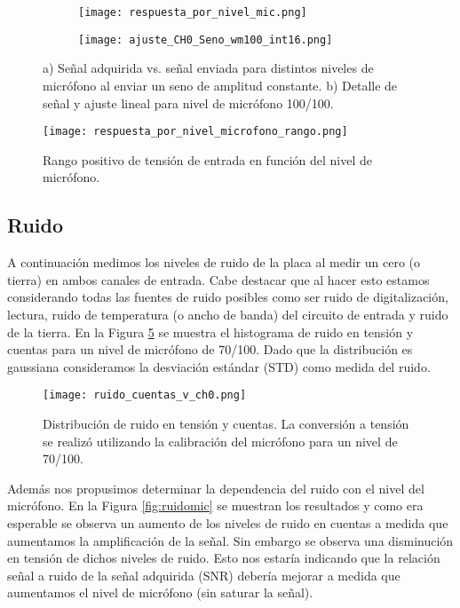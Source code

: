 \documentclass[a4paper, 11pt]{article}
\begin{document}
\begin{figure}[H]
        \begin{subfigure}[b]{0.5\textwidth}
                \centering
                \texttt{[image: respuesta\_por\_nivel\_mic.png]}
                \caption{} \label{fig:calibmic}
        \end{subfigure}%
        \begin{subfigure}[b]{0.5\textwidth}
                \centering
                \texttt{[image: ajuste\_CH0\_Seno\_wm100\_int16.png]}
                \caption{} \label{fig:ejemplo_rangomic}
        \end{subfigure}%
        \caption{a) Señal adquirida vs. señal enviada para distintos niveles de micrófono al enviar un seno de amplitud constante. b) Detalle de señal y ajuste lineal para nivel de micrófono 100/100.}\label{fig:calib_microfono}
\end{figure}

\begin{figure} [H]
\centering
\texttt{[image: respuesta\_por\_nivel\_microfono\_rango.png]}
\caption{Rango positivo de tensión de entrada en función del nivel de micrófono.\label{fig:calib_microfono}}
\end{figure} 

\subsection*{Ruido}
A continuación medimos los niveles de ruido de la placa al medir un cero (o tierra) en ambos canales de entrada. Cabe destacar que al hacer esto estamos considerando todas las fuentes de ruido posibles como ser ruido de digitalización, lectura, ruido de temperatura (o ancho de banda) del circuito de entrada y ruido de la tierra.  En la Figura \ref{fig:ruidocuentas} se muestra el histograma de ruido en tensión y cuentas para un nivel de micrófono de 70/100. Dado que la distribución es gaussiana consideramos la desviación estándar (STD) como medida del ruido.
\begin{figure} [H]
\centering
\texttt{[image: ruido\_cuentas\_v\_ch0.png]}
\caption{Distribución de ruido en tensión y cuentas. La conversión a tensión se realizó utilizando la calibración del micrófono para un nivel de 70/100.\label{fig:ruidocuentas}}
\end{figure} 

Además nos propusimos determinar la dependencia del ruido con el nivel del micrófono. En la Figura \ref{fig:ruidomic}  se muestran los resultados y como era esperable se observa un aumento de los niveles de ruido en cuentas a medida que aumentamos la amplificación de la señal. Sin embargo se observa una disminución en tensión de dichos niveles de ruido. Esto nos estaría indicando que la relación señal a ruido de la señal adquirida (SNR) debería mejorar a medida que aumentamos el nivel de micrófono (sin saturar la señal).
\end{document}
